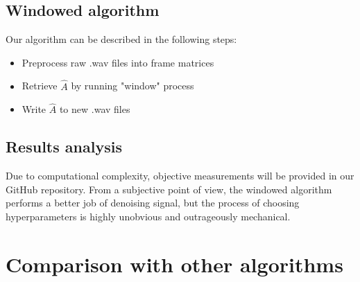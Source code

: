 \subsection{Windowed algorithm}

Our algorithm can be described in the following steps:
\begin{itemize}
	\item Preprocess raw .wav files into frame matrices
	\item Retrieve $\hat{A}$ by running "window" process
	\item Write $\hat{A}$ to new .wav files
\end{itemize}

\subsection{Results analysis}
Due to computational complexity, objective measurements will be provided in our GitHub repository.
\newline
From a subjective point of view, the windowed algorithm performs a better job of denoising signal, but the process of choosing hyperparameters is highly unobvious and outrageously mechanical.

\section{Comparison with other algorithms}

